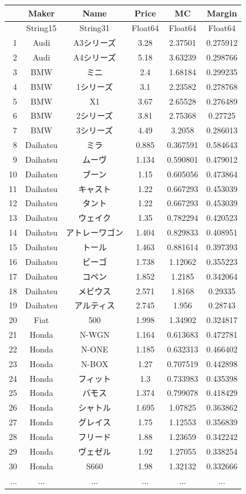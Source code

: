 \documentclass[
  letterpaper,
  DIV=11,
  numbers=noendperiod]{scrreprt}
\begin{document}
\begin{tabular}{r|ccccc}
    & Maker & Name & Price & MC & Margin\\
    \hline
    & String15 & String31 & Float64 & Float64 & Float64\\
    \hline
    1 & Audi & A3シリーズ & 3.28 & 2.37501 & 0.275912 \\
    2 & Audi & A4シリーズ & 5.18 & 3.63239 & 0.298766 \\
    3 & BMW & ミニ & 2.4 & 1.68184 & 0.299235 \\
    4 & BMW & 1シリーズ & 3.1 & 2.23582 & 0.278768 \\
    5 & BMW & X1 & 3.67 & 2.65528 & 0.276489 \\
    6 & BMW & 2シリーズ & 3.81 & 2.75368 & 0.27725 \\
    7 & BMW & 3シリーズ & 4.49 & 3.2058 & 0.286013 \\
    8 & Daihatsu & ミラ & 0.885 & 0.367591 & 0.584643 \\
    9 & Daihatsu & ムーヴ & 1.134 & 0.590801 & 0.479012 \\
    10 & Daihatsu & ブーン & 1.15 & 0.605056 & 0.473864 \\
    11 & Daihatsu & キャスト & 1.22 & 0.667293 & 0.453039 \\
    12 & Daihatsu & タント & 1.22 & 0.667293 & 0.453039 \\
    13 & Daihatsu & ウェイク & 1.35 & 0.782294 & 0.420523 \\
    14 & Daihatsu & アトレーワゴン & 1.404 & 0.829833 & 0.408951 \\
    15 & Daihatsu & トール & 1.463 & 0.881614 & 0.397393 \\
    16 & Daihatsu & ビーゴ & 1.738 & 1.12062 & 0.355223 \\
    17 & Daihatsu & コペン & 1.852 & 1.2185 & 0.342064 \\
    18 & Daihatsu & メビウス & 2.571 & 1.8168 & 0.29335 \\
    19 & Daihatsu & アルティス & 2.745 & 1.956 & 0.28743 \\
    20 & Fiat & 500 & 1.998 & 1.34902 & 0.324817 \\
    21 & Honda & N-WGN & 1.164 & 0.613683 & 0.472781 \\
    22 & Honda & N-ONE & 1.185 & 0.632313 & 0.466402 \\
    23 & Honda & N-BOX & 1.27 & 0.707519 & 0.442898 \\
    24 & Honda & フィット & 1.3 & 0.733983 & 0.435398 \\
    25 & Honda & バモス & 1.374 & 0.799078 & 0.418429 \\
    26 & Honda & シャトル & 1.695 & 1.07825 & 0.363862 \\
    27 & Honda & グレイス & 1.75 & 1.12553 & 0.356839 \\
    28 & Honda & フリード & 1.88 & 1.23659 & 0.342242 \\
    29 & Honda & ヴェゼル & 1.92 & 1.27055 & 0.338254 \\
    30 & Honda & S660 & 1.98 & 1.32132 & 0.332666 \\
    $\dots$ & $\dots$ & $\dots$ & $\dots$ & $\dots$ & $\dots$ \\
\end{tabular}
\end{document}
